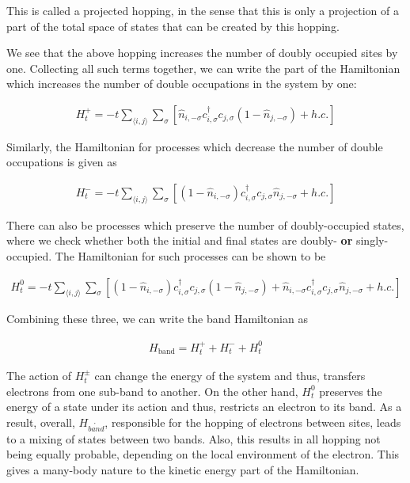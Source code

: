 \documentclass[]{report}
\begin{document}
This is called a projected hopping, in the sense that this is only a projection of a part of the total space of states that can be created by this hopping.

We see that the above hopping increases the number of doubly occupied sites by one. Collecting all such terms together, we can write the part of the Hamiltonian which increases the number of double occupations in the system by one:

\begin{align}\label{eqn:Ht+}
H^{+}_{t} = -t \sum_{\langle i, j \rangle} \sum_{\sigma} \left[ \hat{n}_{i, -\sigma} c^{\dagger}_{i, \sigma} c_{j, \sigma} (1 - \hat{n}_{j, -\sigma}) + h.c.\right]
\end{align}

\newpage
Similarly, the Hamiltonian for processes which decrease the number of double occupations is given as

\begin{align}\label{eqn:Ht-}
	H^{-}_{t} = -t \sum_{\langle i, j \rangle} \sum_{\sigma} \left[ (1 - \hat{n}_{i, -\sigma}) c^{\dagger}_{i, \sigma} c_{j, \sigma} \hat{n}_{j, -\sigma} + h.c.\right]
\end{align}

There can also be processes which preserve the number of doubly-occupied states, where we check whether both the initial and final states are doubly- \textbf{or} singly-occupied. The Hamiltonian for such processes can be shown to be

\begin{align}\label{eqn:Ht0}
	H^{0}_{t} = -t \sum_{\langle i, j \rangle} \sum_{\sigma} \left[ (1 - \hat{n}_{i, -\sigma}) c^{\dagger}_{i, \sigma} c_{j, \sigma} (1 - \hat{n}_{j, -\sigma}) + \hat{n}_{i, -\sigma} c^{\dagger}_{i, \sigma} c_{j, \sigma} \hat{n}_{j, -\sigma} + h.c.\right]
\end{align}

Combining these three, we can write the band Hamiltonian as

\begin{align}\label{eqn:hband}
	H_{\mathrm{band}} = H^{+}_{t} + H^{-}_{t} + H^{0}_{t}
\end{align}

The action of $ H^{\pm}_{t} $ can change the energy of the system and thus, transfers electrons from one sub-band to another. On the other hand, $ H^{0}_{t} $ preserves the energy of a state under its action and thus, restricts an electron to its band. As a result, overall, $ H_{\mathring{band}} $, responsible for the hopping of electrons between sites, leads to a mixing of states between two bands. Also, this results in all hopping not being equally probable, depending on the local environment of the electron. This gives a many-body nature to the kinetic energy part of the Hamiltonian.
\end{document}
